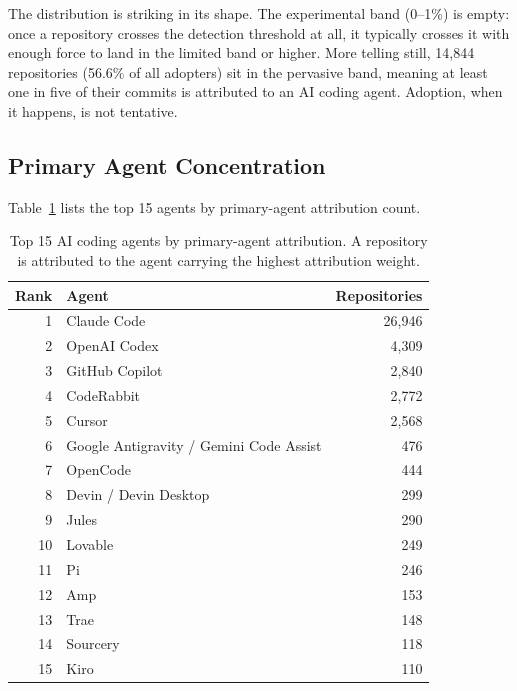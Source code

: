 The distribution is striking in its shape. The experimental band (0--1\%) is empty: once a repository crosses the detection threshold at all, it typically crosses it with enough force to land in the limited band or higher. More telling still, 14,844 repositories (56.6\% of all adopters) sit in the pervasive band, meaning at least one in five of their commits is attributed to an AI coding agent. Adoption, when it happens, is not tentative.

\subsection{Primary Agent Concentration}

Table~\ref{tab:primary_agents} lists the top 15 agents by primary-agent attribution count.

\begin{table}[h]
\centering
\caption{Top 15 AI coding agents by primary-agent attribution. A repository is attributed to the agent carrying the highest attribution weight.}
\label{tab:primary_agents}
\begin{tabular}{@{}rlr@{}}
\toprule
Rank & Agent & Repositories \\
\midrule
 1  & Claude Code                        & 26,946 \\
 2  & OpenAI Codex                       &  4,309 \\
 3  & GitHub Copilot                     &  2,840 \\
 4  & CodeRabbit                         &  2,772 \\
 5  & Cursor                             &  2,568 \\
 6  & Google Antigravity / Gemini Code Assist & 476 \\
 7  & OpenCode                           &    444 \\
 8  & Devin / Devin Desktop              &    299 \\
 9  & Jules                              &    290 \\
10  & Lovable                            &    249 \\
11  & Pi                                 &    246 \\
12  & Amp                                &    153 \\
13  & Trae                               &    148 \\
14  & Sourcery                           &    118 \\
15  & Kiro                               &    110 \\
\bottomrule
\end{tabular}
\end{table}

